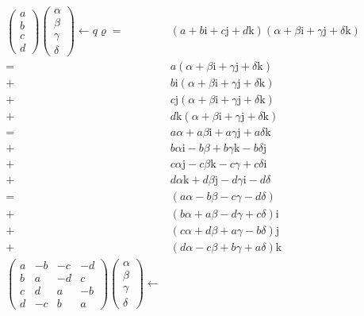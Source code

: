 \documentclass[
]{book}
\theoremstyle{definition}
\theoremstyle{definition}
\theoremstyle{definition}
\theoremstyle{definition}
\theoremstyle{remark}
\begin{document}
\[
\begin{aligned}
\begin{pmatrix}a\\
b\\
c\\
d
\end{pmatrix}\begin{pmatrix}\alpha\\
\beta\\
\gamma\\
\delta
\end{pmatrix}\leftarrow q\varrho= & \left(a+b\mathrm{i}+c\mathrm{j}+d\mathrm{k}\right)\left(\alpha+\beta\mathrm{i}+\gamma\mathrm{j}+\delta\mathrm{k}\right)\\
= & a\left(\alpha+\beta\mathrm{i}+\gamma\mathrm{j}+\delta\mathrm{k}\right)\\
+ & b\mathrm{i}\left(\alpha+\beta\mathrm{i}+\gamma\mathrm{j}+\delta\mathrm{k}\right)\\
+ & c\mathrm{j}\left(\alpha+\beta\mathrm{i}+\gamma\mathrm{j}+\delta\mathrm{k}\right)\\
+ & d\mathrm{k}\left(\alpha+\beta\mathrm{i}+\gamma\mathrm{j}+\delta\mathrm{k}\right)\\
= & a\alpha+a\beta\mathrm{i}+a\gamma\mathrm{j}+a\delta\mathrm{k}\\
+ & b\alpha\mathrm{i}-b\beta+b\gamma\mathrm{k}-b\delta\mathrm{j}\\
+ & c\alpha\mathrm{j}-c\beta\mathrm{k}-c\gamma+c\delta\mathrm{i}\\
+ & d\alpha\mathrm{k}+d\beta\mathrm{j}-d\gamma\mathrm{i}-d\delta\\
= & \left(a\alpha-b\beta-c\gamma-d\delta\right)\\
+ & \left(b\alpha+a\beta-d\gamma+c\delta\right)\mathrm{i}\\
+ & \left(c\alpha+d\beta+a\gamma-b\delta\right)\mathrm{j}\\
+ & \left(d\alpha-c\beta+b\gamma+a\delta\right)\mathrm{k}\\
\begin{pmatrix}a & -b & -c & -d\\
b & a & -d & c\\
c & d & a & -b\\
d & -c & b & a
\end{pmatrix}\begin{pmatrix}\alpha\\
\beta\\
\gamma\\
\delta
\end{pmatrix}\leftarrow\\

\end{aligned}\]
\end{document}
